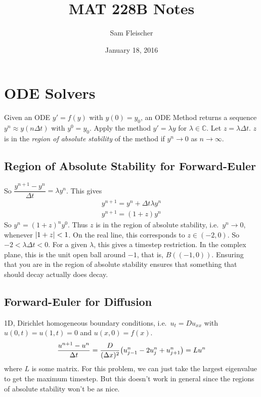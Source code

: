 \documentclass{article}
\title{MAT 228B Notes}
\author{Sam Fleischer}
\date{January 18, 2016}
\newcommand{\Cx}{\mathbb{C}}
\newcommand{\Dx}{\Delta x}
\newcommand{\Dt}{\Delta t}
\begin{document}
    \maketitle

    \section{ODE Solvers}

        Given an ODE $y' = f(y)$ with $y(0) = y_0$, an ODE Method returns a sequence $y^n \approx y(n\Dt)$ with $y^0 = y_0$.  Apply the method $y' = \lambda y$ for $\lambda \in \Cx$.  Let $z = \lambda\Dt$.  $z$ is in the \emph{region of absolute stability} of the method if $y^n \rightarrow 0$ as $n \rightarrow \infty$.

        \subsection{Region of Absolute Stability for Forward-Euler}

            So $\dfrac{y^{n+1} - y^n}{\Dt} = \lambda y^n$.  This gives
            \begin{align*}
                y^{n+1} = y^n + \Dt\lambda y^n \\
                y^{n+1} = (1 + z)y^n
            \end{align*}
            So $y^n = (1 + z)^ny^0$.  Thus $z$ is in the region of absolute stability, i.e.~$y^n \rightarrow 0$, whenever $\abs{1 + z} < 1$.  On the real line, this corresponds to $z \in (-2,0)$.  So $-2 < \lambda\Dt < 0$.  For a given $\lambda$, this gives a timestep restriction.  In the complex plane, this is the unit open ball around $-1$, that is, $B((-1,0))$.  Ensuring that you are in the region of absolute stability ensures that something that should decay actually does decay.

        \subsection{Forward-Euler for Diffusion}

            1D, Dirichlet homogeneous boundary conditions, i.e.~$u_t = Du_{xx}$ with $u(0,t) = u(1,t) = 0$ and $u(x,0) = f(x)$.
            \begin{align*}
                \frac{u^{n+1} - u^n}{\Dt} = \frac{D}{(\Dx)^2}\qty(u^n_{j-1} - 2u^n_j + u^n_{j+1}) = Lu^n
            \end{align*}
            where $L$ is some matrix.  For this problem, we can just take the largest eigenvalue to get the maximum timestep.  But this doesn't work in general since the regions of absolute stability won't be as nice.
\end{document}
